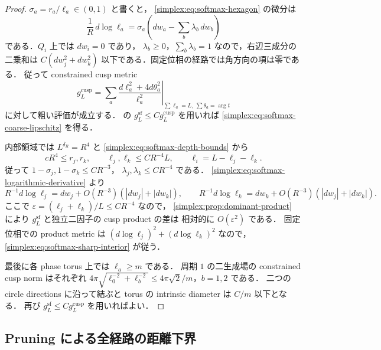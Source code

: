 \begin{proof}
$\sigma_a=r_a/\ell_a\in(0,1)$ と書くと，
\eqref{simplex:eq:softmax-hexagon} の微分は
\begin{equation}\label{simplex:eq:softmax-logarithmic-derivative}
 \frac1R\,d\log\ell_a
 =\sigma_a\left(dw_a-\sum_b\lambda_b\,dw_b\right)
\end{equation}
である．$Q_i$ 上では $dw_i=0$ であり，
$\lambda_b\ge0$，$\sum_b\lambda_b=1$ なので，右辺三成分の二乗和は
$C(dw_j^2+dw_k^2)$ 以下である．固定位相の経路では角方向の項は零である．
従って constrained cusp metric
\[
 g_L^{\mathrm{cusp}}
 =\left.\sum_a
       \frac{d\ell_a^2+4d\theta_a^2}{\ell_a^2}
   \right|_{\sum\ell_a=L,\ \sum\theta_a=\arg t}
\]
に対して粗い評価が成立する．
 の $g_L^{\mathrm{sf}}\le Cg_L^{\mathrm{cusp}}$
を用いれば \eqref{simplex:eq:softmax-coarse-lipschitz} を得る．

内部領域では $L^{\delta_R}=R^4$ と
\eqref{simplex:eq:softmax-depth-bounds} から
\[
 cR^4\le r_j,r_k,\qquad
 \ell_j,\ell_k\le CR^{-4}L,\qquad
 \ell_i=L-\ell_j-\ell_k.
\]
従って $1-\sigma_j,1-\sigma_k\le CR^{-3}$，
$\lambda_j,\lambda_k\le CR^{-4}$ である．
\eqref{simplex:eq:softmax-logarithmic-derivative} より
\[
 R^{-1}d\log\ell_j=dw_j+O(R^{-3})(|dw_j|+|dw_k|),
 \qquad
 R^{-1}d\log\ell_k=dw_k+O(R^{-3})(|dw_j|+|dw_k|).
\]
ここで $\varepsilon=(\ell_j+\ell_k)/L\le CR^{-4}$ なので，
\cref{simplex:prop:dominant-product} により
$g_L^{\mathrm{sf}}$ と独立二因子の cusp product の差は
相対的に $O(\varepsilon^2)$ である．
固定位相での product metric は
$(d\log\ell_j)^2+(d\log\ell_k)^2$ なので，
\eqref{simplex:eq:softmax-sharp-interior} が従う．

最後に各 phase torus 上では $\ell_a\ge m$ である．
周期 $1$ の二生成場の constrained cusp norm はそれぞれ
$4\pi\sqrt{\ell_0^{-2}+\ell_b^{-2}}\le4\pi\sqrt2/m$，$b=1,2$ である．
二つの circle directions に沿って結ぶと torus の intrinsic diameter は $C/m$ 以下となる．
再び $g_L^{\mathrm{sf}}\le Cg_L^{\mathrm{cusp}}$ を用いればよい．
\end{proof}

\subsection{Pruning による全経路の距離下界}

